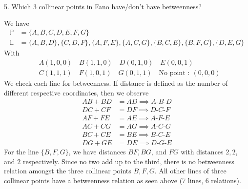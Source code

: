 \documentclass{report}
\begin{document}
    \bigbreak \noindent 
    \begin{mdframed}
        5. Which 3 collinear points in Fano have/don’t have betweenness?
    \end{mdframed}
    \bigbreak \noindent 
    We have 
    \begin{align*}
        \mathbb{P} &= \{A,B,C,D,E,F,G\} \\
        \mathbb{L} &= \{A,B,D\}, \{C,D,F\}, \{A,F,E\}, \{A,C,G\}, \{B,C,E\}, \{B,F,G\}, \{D,E,G\}
    \end{align*}
    With 
    \begin{align*}
            &A(1,0,0) \quad B(1,1,0) \quad D(0,1,0) \quad E(0,0,1) \\
            &C(1,1,1) \quad F(1,0,1) \quad G(0,1,1) \quad \text{No point }:\ (0,0,0)
    \end{align*}
    \bigbreak \noindent 
    We check each line for betweenness. If distance is defined as the number of different respective coordinates, then we observe
    \begin{align*}
        AB + BD &= AD \implies A\text{-}B\text{-}D \\
        DC + CF &= DF \implies D\text{-}C\text{-}F \\
        AF + FE &= AE \implies A\text{-}F\text{-}E \\
        AC + CG &= AG \implies A\text{-}C\text{-}G \\
        BC + CE &= BE  \implies B\text{-}C\text{-}E \\
        DG + GE &= DE  \implies D\text{-}G\text{-}E
    \end{align*}
    For the line $\{B,F,G\}$, we have distances $BF, BG$, and $FG$ with distances $2,2$, and $2$ respectively. Since no two add up to the third, there is no betweenness relation amongst the three collinear points $B,F,G$. All other lines of three collinear points have a betweenness relation as seen above (7 lines, 6 relations).
\end{document}

